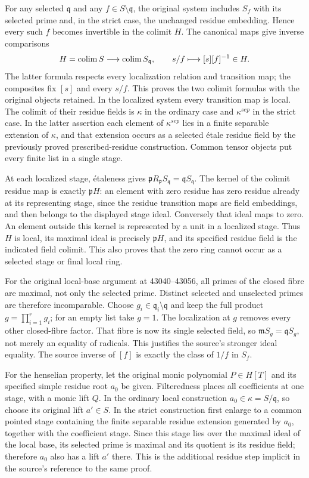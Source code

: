 For any selected \(\mathfrak q\) and any \(f\in S\setminus\mathfrak q\), the original system includes \(S_f\) with its selected prime and, in the strict case, the unchanged residue embedding. Hence every such \(f\) becomes invertible in the colimit \(H\). The canonical maps give inverse comparisons \[
 H=\mathop{\rm colim}S\longrightarrow\mathop{\rm colim}S_{\mathfrak q},
 \qquad s/f\longmapsto [s][f]^{-1}\in H.
\] The latter formula respects every localization relation and transition map; the composites fix \([s]\) and every \(s/f\). This proves the two colimit formulas with the original objects retained. In the localized system every transition map is local. The colimit of their residue fields is \(\kappa\) in the ordinary case and \(\kappa^{sep}\) in the strict case. In the latter assertion each element of \(\kappa^{sep}\) lies in a finite separable extension of \(\kappa\), and that extension occurs as a selected étale residue field by the previously proved prescribed-residue construction. Common tensor objects put every finite list in a single stage.

At each localized stage, étaleness gives \(\mathfrak pR_{\mathfrak p}S_{\mathfrak q}=\mathfrak qS_{\mathfrak q}\). The kernel of the colimit residue map is exactly \(\mathfrak pH\): an element with zero residue has zero residue already at its representing stage, since the residue transition maps are field embeddings, and then belongs to the displayed stage ideal. Conversely that ideal maps to zero. An element outside this kernel is represented by a unit in a localized stage. Thus \(H\) is local, its maximal ideal is precisely \(\mathfrak pH\), and its specified residue field is the indicated field colimit. This also proves that the zero ring cannot occur as a selected stage or final local ring.

For the original local-base argument at 43040--43056, all primes of the closed fibre are maximal, not only the selected prime. Distinct selected and unselected primes are therefore incomparable. Choose \(g_i\in\mathfrak q_i\setminus\mathfrak q\) and keep the full product \(g=\prod_{i=1}^r g_i\); for an empty list take \(g=1\). The localization at \(g\) removes every other closed-fibre factor. That fibre is now its single selected field, so \(\mathfrak mS_g=\mathfrak qS_g\), not merely an equality of radicals. This justifies the source's stronger ideal equality. The source inverse of \([f]\) is exactly the class of \(1/f\) in \(S_f\).

For the henselian property, let the original monic polynomial \(P\in H[T]\) and its specified simple residue root \(a_0\) be given. Filteredness places all coefficients at one stage, with a monic lift \(Q\). In the ordinary local construction \(a_0\in\kappa=S/\mathfrak q\), so choose its original lift \(a'\in S\). In the strict construction first enlarge to a common pointed stage containing the finite separable residue extension generated by \(a_0\), together with the coefficient stage. Since this stage lies over the maximal ideal of the local base, its selected prime is maximal and its quotient is its residue field; therefore \(a_0\) also has a lift \(a'\) there. This is the additional residue step implicit in the source's reference to the same proof.

